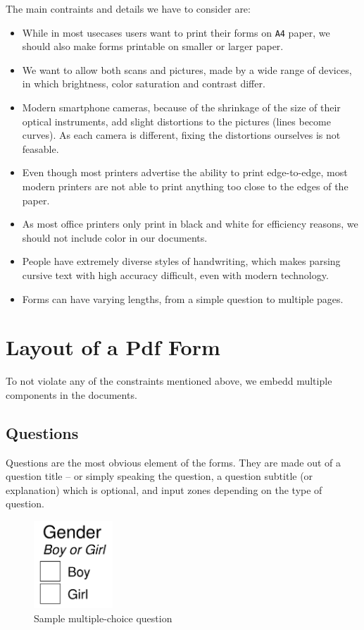 \documentclass[11pt, a4paper]{report}
\def\code#1{\texttt{#1}}
\begin{document}
The main contraints and details we have to consider are:
\begin{itemize}
    \item While in most usecases users want to print their forms on \code{A4} paper, we should also make forms printable on smaller or larger paper.
    \item We want to allow both scans and pictures, made by a wide range of devices, in which brightness, color saturation and contrast differ.
    \item Modern smartphone cameras, because of the shrinkage of the size of their optical instruments, add slight distortions to the pictures (lines become curves). As each camera is different, fixing the distortions ourselves is not feasable.
    \item Even though most printers advertise the ability to print edge-to-edge, most modern printers are not able to print anything too close to the edges of the paper.
    \item As most office printers only print in black and white for efficiency reasons, we should not include color in our documents.
    \item People have extremely diverse styles of handwriting, which makes parsing cursive text with high accuracy difficult, even with modern technology.
    \item Forms can have varying lengths, from a simple question to multiple pages.
\end{itemize}

\section{Layout of a Pdf Form}

To not violate any of the constraints mentioned above, we embedd multiple components in the documents.

\subsection{Questions}

Questions are the most obvious element of the forms. They are made out of a question title -- or simply speaking the question, a question subtitle (or explanation) which is optional, and input zones depending on the type of question.

\begin{figure}[!h]
    \centering
    \includegraphics[width=8em]{images/screenshoots/sample-multiple-choice-question.png}
    \caption{Sample multiple-choice question}
    \label{multiple-choice-question}
\end{figure}
\end{document}
